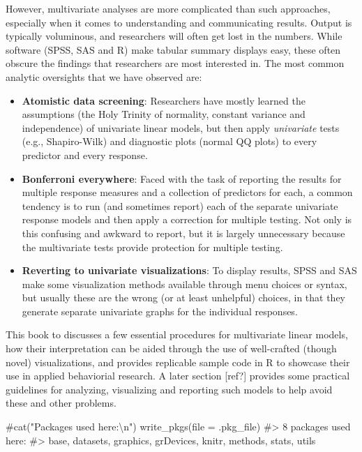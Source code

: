 \documentclass[
  letterpaper,
  10pt,
  krantz2]{krantz}
\makeatletter
\newenvironment{Shaded}{\begin{snugshade}}{\end{snugshade}}
\newcommand{\AttributeTok}[1]{\textcolor[rgb]{0.40,0.45,0.13}{#1}}
\newcommand{\CommentTok}[1]{\textcolor[rgb]{0.37,0.37,0.37}{#1}}
\newcommand{\FunctionTok}[1]{\textcolor[rgb]{0.28,0.35,0.67}{#1}}
\newcommand{\NormalTok}[1]{\textcolor[rgb]{0.00,0.23,0.31}{#1}}
\newenvironment{kframe}{%
  \medskip{}
  \setlength{\fboxsep}{.8em}
  \def\at@end@of@kframe{}%
  \ifinner\ifhmode%
  \def\at@end@of@kframe{\end{minipage}}%
  \begin{minipage}{\columnwidth}%
  \fi\fi%
  \def\FrameCommand##1{\hskip\@totalleftmargin \hskip-\fboxsep
  \colorbox{shadecolor}{##1}\hskip-\fboxsep
      \hskip-\linewidth \hskip-\@totalleftmargin \hskip\columnwidth}%
  \MakeFramed {\advance\hsize-\width
    \@totalleftmargin\z@ \linewidth\hsize
    \@setminipage}}%
{\par\unskip\endMakeFramed%
  \at@end@of@kframe}
\renewenvironment{Shaded}{\begin{kframe}}{\end{kframe}}
\makeatother
\begin{document}
However, multivariate analyses are more complicated than such
approaches, especially when it comes to understanding and communicating
results. Output is typically voluminous, and researchers will often get
lost in the numbers. While software (SPSS, SAS and R) make tabular
summary displays easy, these often obscure the findings that researchers
are most interested in. The most common analytic oversights that we have
observed are:

\begin{itemize}
\item
  \textbf{Atomistic data screening}: Researchers have mostly learned the
  assumptions (the Holy Trinity of normality, constant variance and
  independence) of univariate linear models, but then apply
  \emph{univariate} tests (e.g., Shapiro-Wilk) and diagnostic plots
  (normal QQ plots) to every predictor and every response.
\item
  \textbf{Bonferroni everywhere}: Faced with the task of reporting the
  results for multiple response measures and a collection of predictors
  for each, a common tendency is to run (and sometimes report) each of
  the separate univariate response models and then apply a correction
  for multiple testing. Not only is this confusing and awkward to
  report, but it is largely unnecessary because the multivariate tests
  provide protection for multiple testing.
\item
  \textbf{Reverting to univariate visualizations}: To display results,
  SPSS and SAS make some visualization methods available through menu
  choices or syntax, but usually these are the wrong (or at least
  unhelpful) choices, in that they generate separate univariate graphs
  for the individual responses.
\end{itemize}

This book to discusses a few essential procedures for multivariate
linear models, how their interpretation can be aided through the use of
well-crafted (though novel) visualizations, and provides replicable
sample code in R to showcase their use in applied behaviorial research.
A later section {[}ref?{]} provides some practical guidelines for
analyzing, visualizing and reporting such models to help avoid these and
other problems.

\begin{Shaded}
\begin{Highlighting}[]
\CommentTok{\#cat("Packages used here:\textbackslash{}n")}
\FunctionTok{write\_pkgs}\NormalTok{(}\AttributeTok{file =}\NormalTok{ .pkg\_file)}
\CommentTok{\#\textgreater{} 8  packages used here:}
\CommentTok{\#\textgreater{}  base, datasets, graphics, grDevices, knitr, methods, stats, utils}
\end{Highlighting}
\end{Shaded}
\end{document}
